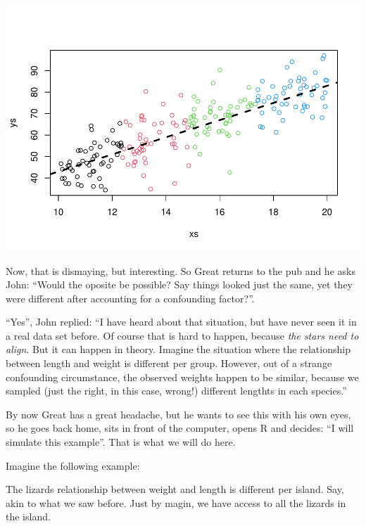 \documentclass[
]{book}
\begin{document}
\includegraphics{ECOMODbook_files/figure-latex/a10.8-1.pdf}

Now, that is dismaying, but interesting. So Great returns to the pub and he asks John: ``Would the oposite be possible? Say things looked just the same, yet they were different after accounting for a confounding factor?''.

``Yes'', John replied: ``I have heard about that situation, but have never seen it in a real data set before. Of course that is hard to happen, because \emph{the stars need to align}. But it can happen in theory. Imagine the situation where the relationship between length and weight is different per group. However, out of a strange confounding circumstance, the observed weights happen to be similar, because we sampled (just the right, in this case, wrong!) different lengthts in each species.''

By now Great has a great headache, but he wants to see this with his own eyes, so he goes back home, sits in front of the computer, opens R and decides: ``I will simulate this example''. That is what we will do here.

Imagine the following example:

The lizards relationship between weight and length is different per island. Say, akin to what we saw before. Just by magin, we have access to all the lizards in the island.
\end{document}
